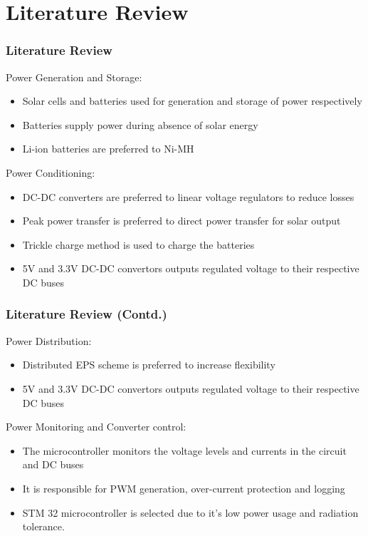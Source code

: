 \documentclass[aspectratio=169]{beamer}
\begin{document}
		\section{Literature Review}
		\begin{frame}
		\frametitle{Literature Review}

				
			Power Generation and Storage:
			\begin{itemize}
			\item  Solar cells and batteries used for generation and storage of power respectively
			\item Batteries supply power during absence of solar energy
			\item Li-ion batteries are preferred to Ni-MH\cite{p4}
		\end{itemize}
	
	
		Power Conditioning:
	\begin{itemize}
		\item DC-DC converters are preferred to linear voltage regulators to reduce losses
		\item Peak power transfer is preferred to direct power transfer for solar output\cite{p2}
		\item Trickle charge\cite{p3} method is used to charge the batteries
		\item 5V and 3.3V DC-DC convertors outputs regulated voltage to their respective DC	 buses
	\end{itemize}
	\end{frame}
	\begin{frame}
		\frametitle{Literature Review (Contd.)}
		
				Power Distribution:
		\begin{itemize}
			\item Distributed EPS scheme\cite{p1} is preferred to increase flexibility
			\item 5V and 3.3V DC-DC convertors outputs regulated voltage to their respective DC	buses
			
		\end{itemize}
		
		
Power Monitoring and Converter control:
	\begin{itemize}
	\item The microcontroller monitors the voltage levels and currents in the circuit and DC buses
	\item It is responsible for PWM generation, over-current protection and logging
	\item STM 32 microcontroller is selected due to it's low power usage and radiation tolerance.

\end{itemize}


	\end{frame}
	
\end{document}
